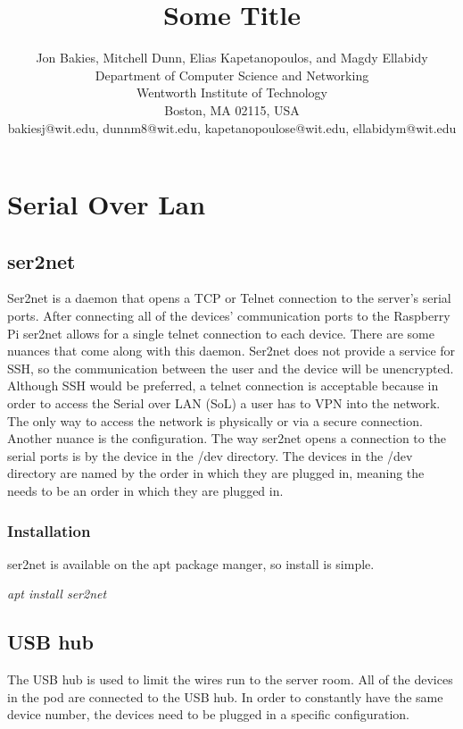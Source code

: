 \documentclass[12pt]{IEEEtran}
\begin{document}
\title{Some Title}
\author{
Jon Bakies, Mitchell Dunn, Elias Kapetanopoulos, and Magdy Ellabidy \\
Department of Computer Science and Networking \\
Wentworth Institute of Technology \\
Boston, MA 02115, USA \\
bakiesj@wit.edu, dunnm8@wit.edu, kapetanopoulose@wit.edu, ellabidym@wit.edu
} 

\maketitle
\newpage
\clearpage

\section{Serial Over Lan}
\subsection{ser2net}
Ser2net is a daemon that opens a TCP or Telnet connection to the server's serial ports.
After connecting all of the devices' communication ports to the Raspberry Pi ser2net allows for a single telnet connection to each device.
There are some nuances that come along with this daemon.
Ser2net does not provide a service for SSH, so the communication between the user and the device will be unencrypted.
Although SSH would be preferred, a telnet connection is acceptable because in order to access the Serial over LAN (SoL) a user has to VPN into the network.
The only way to access the network is physically or via a secure connection.
Another nuance is the configuration.
The way ser2net opens a connection to the serial ports is by the device in the /dev directory.
The devices in the /dev directory are named by the order in which they are plugged in, meaning the needs to be an order in which they are plugged in.
\subsubsection{Installation}
ser2net is available on the apt package manger, so install is simple.

\textit{apt install ser2net}
\subsection{USB hub}
The USB hub is used to limit the wires run to the server room.
All of the devices in the pod are connected to the USB hub.
In order to constantly have the same device number, the devices need to be plugged in a specific configuration.
\end{document}
